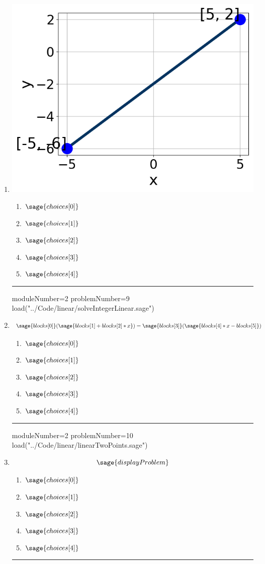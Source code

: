 \documentclass[14pt]{article}
\newcommand{\litem}[1]{\item#1\hspace*{-1cm}\rule{\textwidth}{0.4pt}}
\begin{document}
\begin{enumerate}
\litem{ 

	\begin{center}
	 \includegraphics[width=.3\textwidth]{../Figures/linearGraphToStandardB.png}
	 \end{center}

	\begin{enumerate}[label=\Alph*.]
    \item \( \sage{choices[0]} \)
    \item \( \sage{choices[1]} \)
    \item \( \sage{choices[2]} \)
    \item \( \sage{choices[3]} \)
    \item \( \sage{choices[4]} \)
	\end{enumerate}

}

\begin{sagesilent}
moduleNumber=2
problemNumber=9
load("../Code/linear/solveIntegerLinear.sage")
\end{sagesilent}

\litem{ 

	\[ \sage{blocks[0]}(\sage{blocks[1]+blocks[2]*x}) = \sage{blocks[3]}(\sage{blocks[4]*x-blocks[5]}) \]

	\begin{enumerate}[label=\Alph*.]
    \item \( \sage{choices[0]} \)
    \item \( \sage{choices[1]} \)
    \item \( \sage{choices[2]} \)
    \item \( \sage{choices[3]} \)
    \item \( \sage{choices[4]} \)
	\end{enumerate}

}

\begin{sagesilent}
moduleNumber=2
problemNumber=10
load("../Code/linear/linearTwoPoints.sage")
\end{sagesilent}

\litem{ 

\[ \sage{displayProblem} \]

	\begin{enumerate}[label=\Alph*.]
    \item \( \sage{choices[0]} \)
    \item \( \sage{choices[1]} \)
    \item \( \sage{choices[2]} \)
    \item \( \sage{choices[3]} \)
    \item \( \sage{choices[4]} \)
	\end{enumerate}
}

\end{enumerate}
\end{document}
